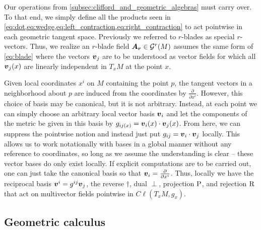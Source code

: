 Our operations from \cref{subsec:clifford_and_geometric_algebras} must carry over. To that end, we simply define all the products seen in \cref{eq:dot,eq:wedge,eq:left_contraction,eq:right_contraction} to act pointwise in each geometric tangent space. Previously we referred to $r$-blades as special $r$-vectors. Thus, we realize an $r$-blade field $\boldsymbol{A_r} \in \mathcal{G}^r(M)$ assumes the same form of \cref{eq:blade} where the vectors $\boldsymbol{v}_j$ are to be understood as vector fields for which all $\boldsymbol{v}_j(x)$ are linearly independent in $T_xM$ at the point $x$.

Given local coordinates $x^i$ on $M$ containing the point $p$, the tangent vectors in a neighborhood about $p$ are induced from the coordinates by $\frac{\partial}{\partial x^i}$. However, this choice of basis may be canonical, but it is not arbitrary. Instead, at each point we can simply choose an arbitrary local vector basis $\boldsymbol{v}_i$ and let the components of the metric be given in this basis by $g_{{ij}(x)} = \boldsymbol{v}_i(x)\cdot \boldsymbol{v}_j(x)$. From here, we can suppress the pointwise notion and instead just put $g_{ij}=\boldsymbol{v}_i\cdot \boldsymbol{v}_j$ locally. This allows us to work notationally with bases in a global manner without any reference to coordinates, so long as we assume the understanding is clear -- these vector bases do only exist locally. If explicit computations are to be carried out, one can just take the canonical basis so that $\boldsymbol{v}_i=\frac{\partial}{\partial x^i}$. Thus, locally we have the reciprocal basis $\boldsymbol{v}^i=g^{ij}\boldsymbol{v}_j$, the reverse $\dagger$, dual $\perp$, projection $\operatorname{P}$, and rejection $\operatorname{R}$ that act on multivector fields pointwise in $C\ell(T_xM,g_x)$. 

\subsection{Geometric calculus}

